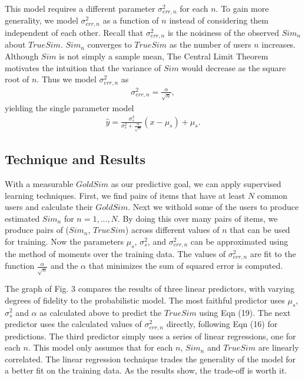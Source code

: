 \documentclass[11pt]{article}
\begin{document}
This model requires a different parameter $\sigma_{err,n}^2$ for each $n$.  To
gain more generality, we model $\sigma_{err,n}^2$ as a function of $n$ instead
of considering them independent of each other. Recall that $\sigma_{err,n}^2$ is
the noisiness of the observed $Sim_n$ about $TrueSim$.  $Sim_n$ converges to
$TrueSim$ as the number of users $n$ increases. Although $Sim$ is not simply a
sample mean, The Central Limit Theorem motivates the intuition that the variance of 
$Sim$ would decrease as the square root of $n$. Thus we model $\sigma_{err,n}^2$ as
\begin{align}
\sigma_{err,n}^2 = \frac{\alpha}{\sqrt{n}},
\end{align}
yielding the single parameter model
\begin{align}
\hat{y}= \frac{\sigma_{s}^2}{\sigma_{s}^2+\frac{\alpha}{\sqrt{n}}}
\left(x -\mu_s\right) + \mu_s.
\end{align}


\subsection*{Technique and Results}
With a measurable $GoldSim$ as our predictive goal, we can apply supervised 
learning techniques. First, we find pairs of items that have at least $N$ common
users and calculate their $GoldSim$. Next we withold some of the users to 
produce estimated $Sim_n$ for $n=1,...,N$. By doing this over many pairs of 
items, we produce pairs of ($Sim_n$, $TrueSim$) across different values of $n$ 
that can be used for training. Now the parameters $\mu_s$, $\sigma_{s}^2$, and 
$\sigma_{err,n}^2$ can be approximated using the method of moments over the 
training data. The values of $\sigma_{err,n}^2$ are fit to the function 
$\frac{\alpha}{\sqrt{n}}$ and the $\alpha$ that minimizes the sum of squared 
error is computed.

The graph of Fig. 3 compares the results of three linear predictors, with varying
degrees of fidelity to the probabilistic model. The most faithful predictor uses
$\mu_s$, $\sigma_{s}^2$ and $\alpha$ as calculated above to predict the $TrueSim$
using Eqn (19). The next predictor uses the calculated values of $\sigma_{err,n}^2$
directly, following Eqn (16) for predictions. The third predictor simply uses a series
of linear regressions, one for each $n$. This model only assumes that for each
$n$, $Sim_n$ and $TrueSim$ are linearly correlated. The linear regression
technique trades the generality of the model for a better fit on the training
data.  As the results show, the trade-off is worth it.
\end{document}
